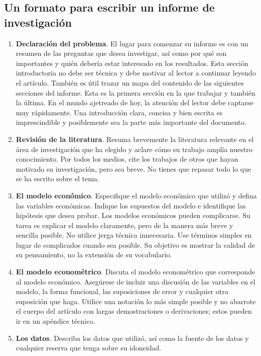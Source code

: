 \subsection{Un formato para escribir un informe de investigación}
\begin{enumerate}[\bfseries 1.]
    \item \textbf{Declaración del problema}. El lugar para comenzar su informe es con un resumen de las preguntas que desea investigar, así como por qué son importantes y quién debería estar interesado en los resultados. Esta sección introductoria no debe ser técnica y debe motivar al lector a continuar leyendo el artículo. También es útil trazar un mapa del contenido de las siguientes secciones del informe. Esta es la primera sección en la que trabajar y también la última. En el mundo ajetreado de hoy, la atención del lector debe captarse muy rápidamente. Una introducción clara, concisa y bien escrita es imprescindible y posiblemente sea la parte más importante del documento. 
    \item \textbf{Revisión de la literatura}. Resuma brevemente la literatura relevante en el área de investigación que ha elegido y aclare cómo su trabajo amplía nuestro conocimiento. Por todos los medios, cite los trabajos de otros que hayan motivado su investigación, pero sea breve. No tienes que repasar todo lo que se ha escrito sobre el tema. 
    \item \textbf{El modelo económico}. Especifique el modelo económico que utilizó y defina las variables económicas. Indique los supuestos del modelo e identifique las hipótesis que desea probar. Los modelos económicos pueden complicarse. Su tarea es explicar el modelo claramente, pero de la manera más breve y sencilla posible. No utilice jerga técnica innecesaria. Use términos simples en lugar de complicados cuando sea posible. Su objetivo es mostrar la calidad de su pensamiento, no la extensión de su vocabulario. 
    \item \textbf{El modelo econométrico}. Discuta el modelo econométrico que corresponde al modelo económico. Asegúrese de incluir una discusión de las variables en el modelo, la forma funcional, las suposiciones de error y cualquier otra suposición que haga. Utilice una notación lo más simple posible y no abarrote el cuerpo del artículo con largas demostraciones o derivaciones; estos pueden ir en un apéndice técnico. 
    \item \textbf{Los datos}. Describa los datos que utilizó, así como la fuente de los datos y cualquier reserva que tenga sobre su idoneidad. 

\end{enumerate}
